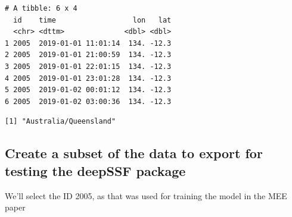 \documentclass[
  letterpaper,
  DIV=11,
  numbers=noendperiod]{scrartcl}
\newenvironment{Shaded}{\begin{snugshade}}{\end{snugshade}}
\newcommand{\CommentTok}[1]{\textcolor[rgb]{0.37,0.37,0.37}{#1}}
\newcommand{\FunctionTok}[1]{\textcolor[rgb]{0.28,0.35,0.67}{#1}}
\newcommand{\NormalTok}[1]{\textcolor[rgb]{0.00,0.23,0.31}{#1}}
\newcommand{\OtherTok}[1]{\textcolor[rgb]{0.00,0.23,0.31}{#1}}
\newcommand{\SpecialCharTok}[1]{\textcolor[rgb]{0.37,0.37,0.37}{#1}}
\begin{document}
\begin{verbatim}
# A tibble: 6 x 4
  id    time                  lon   lat
  <chr> <dttm>              <dbl> <dbl>
1 2005  2019-01-01 11:01:14  134. -12.3
2 2005  2019-01-01 21:00:59  134. -12.3
3 2005  2019-01-01 22:01:15  134. -12.3
4 2005  2019-01-01 23:01:28  134. -12.3
5 2005  2019-01-02 00:01:12  134. -12.3
6 2005  2019-01-02 03:00:36  134. -12.3
\end{verbatim}

\begin{Shaded}
\end{Shaded}

\begin{verbatim}
[1] "Australia/Queensland"
\end{verbatim}

\begin{Shaded}
\end{Shaded}

\subsection{Create a subset of the data to export for testing the
deepSSF
package}\label{create-a-subset-of-the-data-to-export-for-testing-the-deepssf-package}

We'll select the ID 2005, as that was used for training the model in the
MEE paper
\end{document}
